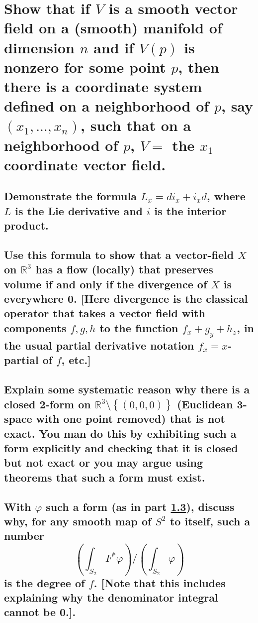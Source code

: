 \documentclass[10pt]{article}
\newcommand{\advsection}{\addtocounter{section}{1} \setcounter{subsection}{0}}
\begin{document}
 

\section{Show that if $V$ is a smooth vector field on a (smooth) manifold of dimension $n$ and if
  $V(p)$ is nonzero for some point $p$, then there is a coordinate system defined on a neighborhood
  of $p$, say $(x_1, \dots, x_n)$, such that on a neighborhood of $p$, $V =$ the $x_1$ coordinate
  vector field.}

\advsection{}

\subsection{Demonstrate the formula $L_x = di_x + i_x d$, where $L$ is the Lie derivative and $i$ is
  the interior product.}

\subsection{Use this formula to show that a vector-field $X$ on $\mathbb{R}^3$ has a flow (locally)
  that preserves volume if and only if the divergence of $X$ is everywhere 0. [Here divergence is
  the classical operator that takes a vector field with components $f,g,h$ to the function $f_x +
  g_y + h_z$, in the usual partial derivative notation $f_x = x$-partial of $f$, etc.]}

\advsection{}

\subsection{Explain some systematic reason why there is a closed 2-form on $\mathbb{R}^3 \setminus
  \left\{ (0,0,0) \right\} $ (Euclidean 3-space with one point removed) that is not exact. You man
  do this by exhibiting such a form explicitly and checking that it is closed but not exact or you
  may argue using theorems that such a form must exist.}
\label{above}

\subsection{With $\varphi$ such a form (as in part \ref{above}), discuss why, for any smooth map of
  $S^2$ to itself, such a number
  $$\left(\int_{S_2} F^* \varphi\right) / \left(\int_{S_2}\varphi  \right)$$
  is the degree of $f$. [Note that this includes explaining why the denominator integral cannot be 0.].}
\end{document}
